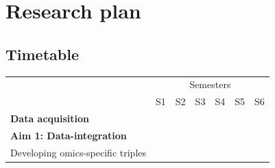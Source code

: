 \documentclass[twoside,fontsize=12pt]{article}
\begin{document}
\section*{Research plan}
\subsection*{Timetable}
\begin{table}[h]
\begin{center}
\begin{tabular}{lllllll}
                                                & \multicolumn{6}{c}{Semesters}                                                                                                                                                                                                                                                                                                                                                                                 \\ \cline{2-7} 
                                                & S1                                              & S2                                              & S3                                              & S4                                              & S5                                              & S6                                                                                          \\ \hline
\textbf{Data acquisition}               &           & \cellcolor[HTML]{343434}{\color[HTML]{656565} } & \cellcolor[HTML]{343434}{\color[HTML]{656565} } & \cellcolor[HTML]{343434}{\color[HTML]{656565} } & \cellcolor[HTML]{343434}{\color[HTML]{656565} } & \cellcolor[HTML]{343434}{\color[HTML]{656565} }   \\
\textbf{Aim 1: Data-integration}                & \cellcolor[HTML]{343434}                        & \cellcolor[HTML]{343434}                                             &                                                 &                                                 &                                                                                              \\
\hspace*{1em} Developing omics-specific triples & \cellcolor[HTML]{656565}                        &                                                 &                                                 &                                                 &                                                 &                                                                                                 \\

\end{tabular}
\end{center}
\end{table}
\end{document}
